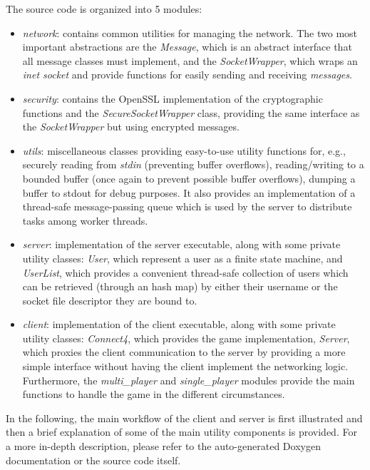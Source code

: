 The source code is organized into 5 modules:
\begin{itemize}
    \item \emph{network}: contains common utilities for managing the network. 
        The two most important abstractions are the \emph{Message}, which 
        is an abstract interface that all message classes must implement, and 
        the \emph{SocketWrapper}, which wraps an \emph{inet socket} and 
        provide functions for easily sending and receiving \emph{messages}.
    \item \emph{security}: contains the OpenSSL implementation of the 
        cryptographic functions and the \emph{SecureSocketWrapper} class,
        providing the same interface as the \emph{SocketWrapper} but using 
        encrypted messages.
    \item \emph{utils}: miscellaneous classes providing easy-to-use utility 
        functions for, e.g., securely reading from \emph{stdin} (preventing 
        buffer overflows), reading/writing to a bounded buffer (once again 
        to prevent possible buffer overflows), dumping a buffer to stdout 
        for debug purposes. It also provides an implementation of a thread-safe
        message-passing queue which is used by the server to distribute tasks
        among worker threads.
    \item \emph{server}: implementation of the server executable, along with
        some private utility classes: \emph{User}, which represent a user as 
        a finite state machine, and \emph{UserList}, which provides a convenient
        thread-safe collection of users which can be retrieved (through an
        hash map) by either their username or the socket file descriptor they 
        are bound to.
    \item \emph{client}: implementation of the client executable, along with 
        some private utility classes: \emph{Connect4}, which provides the game 
        implementation, \emph{Server}, which proxies the client communication 
        to the server by providing a more simple interface without having the 
        client implement the networking logic. 
        Furthermore, the \emph{multi\_player} and \emph{single\_player} modules 
        provide the main functions to handle the game in the different 
        circumstances.
\end{itemize}

In the following, the main workflow of the client and server is first
illustrated and then a brief explanation of some of the main utility components 
is provided. For a more in-depth description, please refer to the auto-generated
Doxygen documentation or the source code itself.

